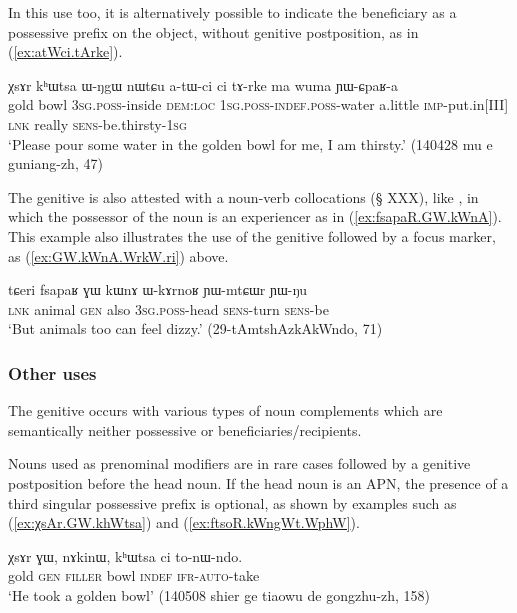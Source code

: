 In this use too, it is alternatively possible to indicate the beneficiary as a possessive prefix on the object, without genitive postposition, as in (\ref{ex:atWci.tArke}).

 \begin{exe}
\ex \label{ex:atWci.tArke}
\gll   χsɤr kʰɯtsa ɯ-ŋgɯ nɯtɕu a-tɯ-ci ci tɤ-rke ma wuma ɲɯ-ɕpaʁ-a \\
gold bowl \textsc{3sg}.\textsc{poss}-inside \textsc{dem}:\textsc{loc} \textsc{1sg}.\textsc{poss}-\textsc{indef}.\textsc{poss}-water a.little \textsc{imp}-put.in[III] \textsc{lnk} really \textsc{sens}-be.thirsty-\textsc{1sg} \\
\glt  `Please pour some water in the golden bowl for me, I am thirsty.' (140428 mu e guniang-zh, 47)
\end{exe}

The genitive is also attested with a noun-verb collocations (§ XXX), like , in which the possessor  of the noun is an experiencer as in (\ref{ex:fsapaR.GW.kWnA}). This example also illustrates the use of the genitive followed by a focus marker, as (\ref{ex:GW.kWnA.WrkW.ri}) above.

\begin{exe}
\ex \label{ex:fsapaR.GW.kWnA}
\gll tɕeri fsapaʁ ɣɯ kɯnɤ ɯ-kɤrnoʁ ɲɯ-mtɕɯr ɲɯ-ŋu \\
\textsc{lnk} animal \textsc{gen} also \textsc{3sg}.\textsc{poss}-head \textsc{sens}-turn \textsc{sens}-be \\
\glt `But animals too can feel dizzy.' (29-tAmtshAzkAkWndo, 71)
\end{exe}


\subsubsection{Other uses} \label{sec:gen.other}
The genitive  occurs with various types of noun complements which are semantically neither possessive or beneficiaries/recipients. 

Nouns used as prenominal modifiers are in rare cases followed by a genitive postposition before the head noun. If the head noun is an APN, the presence of a third singular possessive prefix  is optional, as shown by examples such as (\ref{ex:χsAr.GW.khWtsa}) and (\ref{ex:ftsoR.kWngWt.WphW}). 

\begin{exe}
\ex \label{ex:χsAr.GW.khWtsa}
\gll  χsɤr ɣɯ, nɤkinɯ, kʰɯtsa ci to-nɯ-ndo. \\
gold \textsc{gen} \textsc{filler} bowl \textsc{indef} \textsc{ifr}-\textsc{auto}-take \\
\glt `He took a golden bowl' (140508 shier ge tiaowu de gongzhu-zh, 158)
\end{exe}

